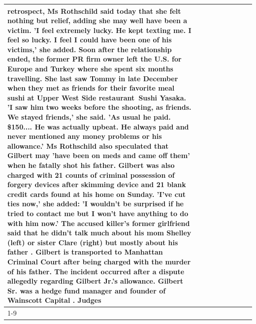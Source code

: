 \begin{table}[H]
\begin{tabular}{lllrlllll}
retrospect, Ms Rothschild said today that she felt nothing but relief, adding she may well have been a victim. 'I feel extremely lucky. He kept texting me. I feel so lucky. I feel I could have been one of his victims,' she added. Soon after the relationship ended, the former PR firm owner left the U.S. for Europe and Turkey where she spent six months  travelling. She last saw Tommy in late December when they met as friends for their favorite meal sushi at Upper West Side restaurant Sushi Yasaka. 'I saw him two weeks before the shooting, as friends. We stayed friends,' she said. 'As usual he paid. \$150.... He was actually upbeat. He always paid and never mentioned any money problems or his allowance.' Ms Rothschild also speculated that Gilbert may 'have been on meds and came off them' when he fatally shot his father. Gilbert was also charged with 21 counts of criminal possession of forgery devices after skimming device and 21 blank credit cards found at his home on Sunday. 'I've cut ties now,' she added: 'I wouldn’t be surprised if he tried to contact me but I won’t have anything to do with him now.' The accused killer's former girlfriend said that he didn't talk much about his mom Shelley (left) or sister Clare (right) but mostly about his father . Gilbert is transported to Manhattan Criminal Court  after being charged with the murder of his father. The incident occurred after a dispute allegedly regarding Gilbert Jr.'s allowance. Gilbert Sr. was a hedge fund manager and founder of Wainscott Capital . Judges \\
\cline{1-9}

\end{tabular}
\end{table}
